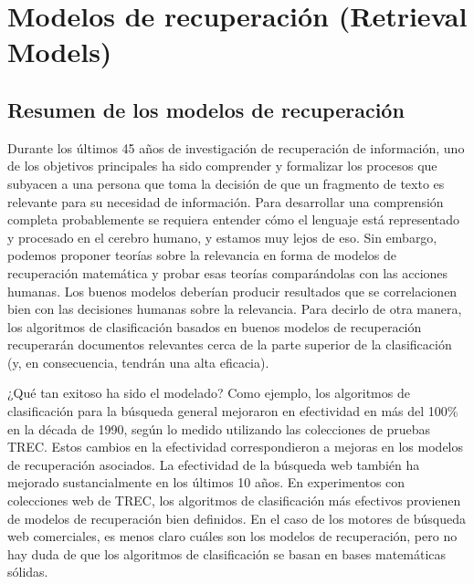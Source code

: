 

\chapter{Modelos de recuperación (Retrieval Models)}
\section{Resumen de los modelos de recuperación}

Durante los últimos 45 años de investigación de recuperación de información, uno de los objetivos principales ha sido comprender y formalizar los procesos que subyacen a una persona que toma la decisión de que un fragmento de texto es relevante para su necesidad de información. Para desarrollar una comprensión completa probablemente se requiera entender cómo el lenguaje
está representado y procesado en el cerebro humano, y estamos muy lejos de eso. Sin embargo, podemos proponer teorías sobre la relevancia en forma de modelos de recuperación matemática y probar esas teorías comparándolas con las acciones humanas. Los buenos modelos deberían producir resultados que se correlacionen bien con las decisiones humanas sobre la relevancia. Para decirlo de otra manera, los algoritmos de clasificación basados ​​en buenos modelos de recuperación recuperarán documentos relevantes cerca de la parte superior de la clasificación (y, en consecuencia, tendrán una alta eficacia).


¿Qué tan exitoso ha sido el modelado? Como ejemplo, los algoritmos de clasificación para la búsqueda general mejoraron en efectividad en más del 100\% en la década de 1990, según lo medido utilizando las colecciones de pruebas TREC. Estos cambios en la efectividad correspondieron a mejoras en los modelos de recuperación asociados. La efectividad de la búsqueda web también ha mejorado sustancialmente en los últimos 10 años. En experimentos con colecciones web de TREC, los algoritmos de clasificación más efectivos provienen de modelos de recuperación bien definidos. En el caso de los motores de búsqueda web comerciales, es menos claro cuáles son los modelos de recuperación, pero no hay duda de que los algoritmos de clasificación se basan en bases matemáticas sólidas.

